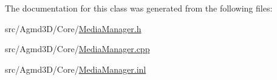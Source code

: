 The documentation for this class was generated from the following files\+:\begin{DoxyCompactItemize}
\item 
src/\+Agmd3\+D/\+Core/\hyperlink{_media_manager_8h}{Media\+Manager.\+h}\item 
src/\+Agmd3\+D/\+Core/\hyperlink{_media_manager_8cpp}{Media\+Manager.\+cpp}\item 
src/\+Agmd3\+D/\+Core/\hyperlink{_media_manager_8inl}{Media\+Manager.\+inl}\end{DoxyCompactItemize}
